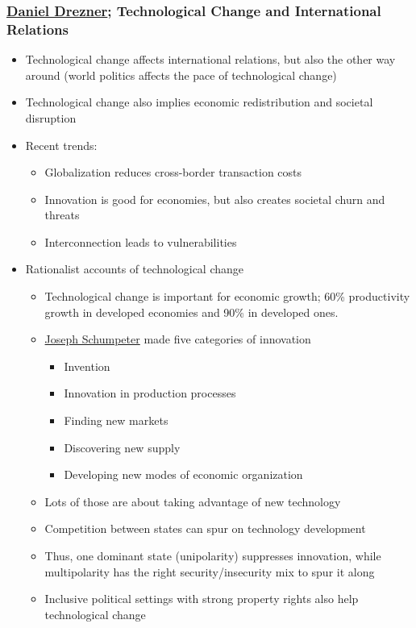 \documentclass[11pt]{article}
\begin{document}
\subsubsection{\href{Daniel Drezner.org}{Daniel Drezner}; Technological Change and International Relations}
\label{sec:orgac62a51}
\begin{itemize}
\item Technological change affects international relations, but also the other way
around (world politics affects the pace of technological change)
\item Technological change also implies economic redistribution and societal disruption
\item Recent trends:
\begin{itemize}
\item Globalization reduces cross-border transaction costs
\item Innovation is good for economies, but also creates societal churn and threats
\item Interconnection leads to vulnerabilities
\end{itemize}
\item Rationalist accounts of technological change
\begin{itemize}
\item Technological change is important for economic growth; 60\% productivity
growth in developed economies and 90\% in developed ones.
\item \href{Joseph Schumpeter.org}{Joseph Schumpeter} made five categories of innovation
\begin{itemize}
\item Invention
\item Innovation in production processes
\item Finding new markets
\item Discovering new supply
\item Developing new modes of economic organization
\end{itemize}
\item Lots of those are about taking advantage of new technology
\item Competition between states can spur on technology development
\item Thus, one dominant state (unipolarity) suppresses innovation, while
multipolarity has the right security/insecurity mix to spur it along
\item Inclusive political settings with strong property rights also help
technological change

\end{itemize}
\end{itemize}
\end{document}
